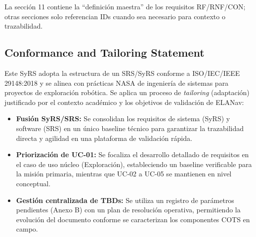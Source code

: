 La sección 11 contiene la ``definición maestra'' de los requisitos RF/RNF/CON; otras secciones solo referencian IDs cuando sea necesario para contexto o trazabilidad. \cite{nasa_se_handbook, segoldmine_ppi}

\subsection{Conformance and Tailoring Statement}
Este SyRS adopta la estructura de un SRS/SyRS conforme a ISO/IEC/IEEE 29148:2018 y se alinea con prácticas NASA de ingeniería de sistemas para proyectos de exploración robótica. Se aplica un proceso de \textit{tailoring} (adaptación) justificado por el contexto académico y los objetivos de validación de ELANav: \cite{ieee_29148, nasa_se_handbook}

\begin{itemize}
    \item \textbf{Fusión SyRS/SRS:} Se consolidan los requisitos de sistema (SyRS) y software (SRS) en un único baseline técnico para garantizar la trazabilidad directa y agilidad en una plataforma de validación rápida.
    \item \textbf{Priorización de UC-01:} Se focaliza el desarrollo detallado de requisitos en el caso de uso núcleo (Exploración), estableciendo un baseline verificable para la misión primaria, mientras que UC-02 a UC-05 se mantienen en nivel conceptual.
    \item \textbf{Gestión centralizada de TBDs:} Se utiliza un registro de parámetros pendientes (Anexo B) con un plan de resolución operativa, permitiendo la evolución del documento conforme se caracterizan los componentes COTS en campo.
\end{itemize} 
